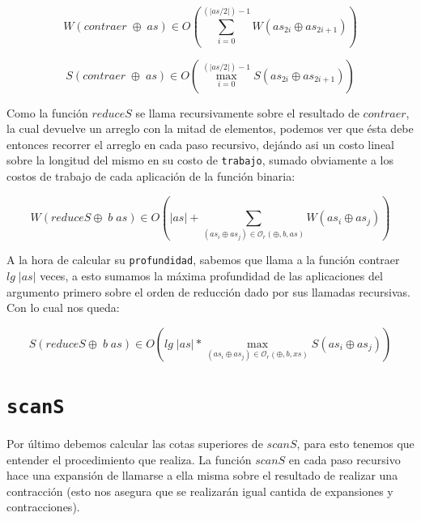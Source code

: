 \documentclass[a4paper,10pt]{article}
\begin{document}
\begin{equation*}
    W \left( contraer \;\oplus \;as \right) \in
    O \left( \sum_{i=0}^{(\vert as / 2 \vert) - 1} W \left( as_{2i} \oplus as_{2i+1} \right) \right)
\end{equation*}

\begin{equation*}
    S \left( contraer \;\oplus \;as \right) \in
    O \left( \max_{i=0}^{(\vert as / 2 \vert) - 1} S \left( as_{2i} \oplus as_{2i+1} \right) \right)
\end{equation*}

\bigskip

    Como la función $reduceS$ se llama recursivamente sobre el resultado de $contraer$,
la cual devuelve un arreglo con la mitad de elementos, podemos ver que ésta debe
entonces recorrer el arreglo en cada paso recursivo, dejándo asi un costo lineal sobre
la longitud del mismo en su costo de \texttt{trabajo}, sumado obviamente a los costos
de trabajo de cada aplicación de la función binaria:

\begin{equation*}
    W \left( reduceS \oplus \; b \; as \right) \in
    O \left( \vert as \vert + \sum_{(as_i \oplus as_j) \in \mathcal{O}_r(\oplus,b,as)} W \left( as_i \oplus as_j \right) \right)
\end{equation*}

\bigskip
    A la hora de calcular su \texttt{profundidad}, sabemos que llama a la función
contraer $lg \;\vert as \vert$ veces, a esto sumamos la máxima profundidad de las 
aplicaciones del argumento primero sobre el orden de reducción dado por sus 
llamadas recursivas. Con lo cual nos queda:

\begin{equation*}
    S \left( reduceS \oplus \; b \; as \right) \in
    O \left( lg \; \vert as \vert * \max_{(as_i \oplus as_j) \in \mathcal{O}_r(\oplus,b,xs)} S \left( as_i \oplus as_j \right) \right)
\end{equation*}


\bigskip


\section*{\texttt{scanS}}

    Por último debemos calcular las cotas superiores de $scanS$, para
esto tenemos que entender el procedimiento que realiza. La función $scanS$ en
cada paso recursivo hace una expansión de llamarse a ella misma 
sobre el resultado de realizar una contracción (esto nos asegura que se 
realizarán igual cantida de expansiones y contracciones).
\end{document}
